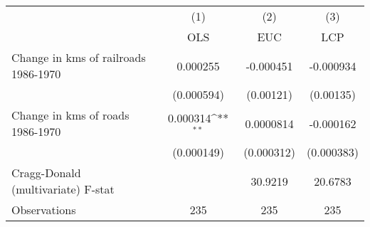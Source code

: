 {
\def\sym#1{\ifmmode^{#1}\else\(^{#1}\)\fi}
\begin{tabular}{l*{3}{c}}
\hline\hline
                &\multicolumn{1}{c}{(1)}&\multicolumn{1}{c}{(2)}&\multicolumn{1}{c}{(3)}\\
                &\multicolumn{1}{c}{OLS}&\multicolumn{1}{c}{EUC}&\multicolumn{1}{c}{LCP}\\
\hline
Change in kms of railroads 1986-1970& 0.000255         &-0.000451         &-0.000934         \\
                &(0.000594)         &(0.00121)         &(0.00135)         \\
[1em]
Change in kms of roads 1986-1970& 0.000314\sym{**} &0.0000814         &-0.000162         \\
                &(0.000149)         &(0.000312)         &(0.000383)         \\
\hline
Cragg-Donald (multivariate) F-stat&                  &  30.9219         &  20.6783         \\
Observations    &      235         &      235         &      235         \\
\hline\hline
\end{tabular}
}
